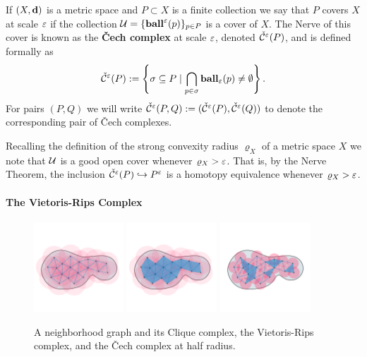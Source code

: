 If $(X,\mathbf{d})$ is a metric space and $P\subset X$ is a finite collection we say that $P$ covers $X$ at scale $\varepsilon$ if the collection $\mathcal{U} = \{\mathbf{ball}^\varepsilon(p)\}_{p\in P}$ is a cover of $X$.
The Nerve of this cover is known as the \textbf{\v Cech complex} at scale $\varepsilon$, denoted $\check{\mathcal{C}}^\varepsilon(P)$, and is defined formally as
\[ \check{\mathcal{C}}^\varepsilon(P) := \left\{\sigma \subseteq P\mid \bigcap_{p\in \sigma}\mathbf{ball}_\varepsilon(p)\neq \emptyset \right\}. \]
For pairs $(P, Q)$ we will write $\check{\mathcal{C}}^\varepsilon(P,Q) := (\check{\mathcal{C}}^\varepsilon(P), \check{\mathcal{C}}^\varepsilon(Q))$ to denote the corresponding pair of \v Cech complexes.

Recalling the definition of the strong convexity radius $\varrho_X$ of a metric space $X$ we note that $\mathcal{U}$ is a good open cover whenever $\varrho_X > \varepsilon$.
That is, by the Nerve Theorem, the inclusion $\check{\mathcal{C}}^\varepsilon(P)\hookrightarrow P^\varepsilon$ is a homotopy equivalence whenever $\varrho_X > \varepsilon$.

\paragraph{The Vietoris-Rips Complex}

\begin{figure}[htbp]
  \centering
  \includegraphics[trim=0 300 0 500, clip, width=0.3\textwidth]{figures/rips/graph2}
  \includegraphics[trim=0 300 0 500, clip, width=0.3\textwidth]{figures/rips/rips2}
  \includegraphics[trim=0 300 0 500, clip, width=0.3\textwidth]{figures/rips/cech}
  \caption{A neighborhood graph and its Clique complex, the Vietoris-Rips complex, and the \v Cech complex at half radius.}\label{fig:rips}
\end{figure}

